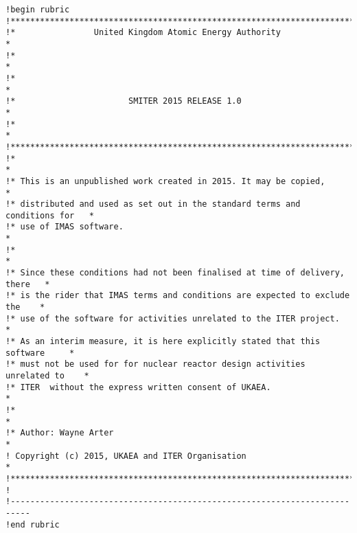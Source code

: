 {\small
\begin{verbatim}
!begin rubric
!******************************************************************************
!*                United Kingdom Atomic Energy Authority                      *
!*                                                                            *
!*                                                                            *
!*                       SMITER 2015 RELEASE 1.0                              *
!*                                                                            *
!******************************************************************************
!*                                                                            *
!* This is an unpublished work created in 2015. It may be copied,             *
!* distributed and used as set out in the standard terms and conditions for   *
!* use of IMAS software.                                                      * 
!*                                                                            *
!* Since these conditions had not been finalised at time of delivery, there   *
!* is the rider that IMAS terms and conditions are expected to exclude the    *
!* use of the software for activities unrelated to the ITER project.          *
!* As an interim measure, it is here explicitly stated that this software     *
!* must not be used for for nuclear reactor design activities unrelated to    *
!* ITER  without the express written consent of UKAEA.                        *
!*                                                                            *
!* Author: Wayne Arter                                                        *
! Copyright (c) 2015, UKAEA and ITER Organisation                             *
!******************************************************************************
!
!--------------------------------------------------------------------------
!end rubric
\end{verbatim}
}
